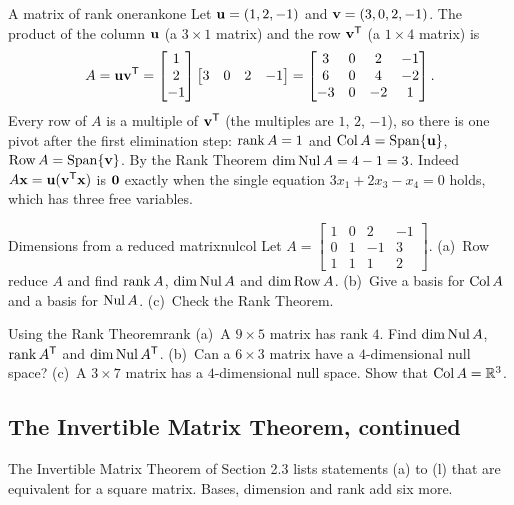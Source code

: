 \documentclass[11pt]{article}
\begin{document}
\begin{exmp}{A matrix of rank one}{rankone}
Let $\mathbf{u}=(1,2,-1)$ and $\mathbf{v}=(3,0,2,-1)$. The product of the column $\mathbf{u}$ (a $3\times1$ matrix) and the row $\mathbf{v}^{\mathsf T}$ (a $1\times4$ matrix) is
\[
A=\mathbf{u}\mathbf{v}^{\mathsf T}=\begin{bmatrix}1\\2\\-1\end{bmatrix}\begin{bmatrix}3&0&2&-1\end{bmatrix}=\begin{bmatrix}3&0&2&-1\\6&0&4&-2\\-3&0&-2&1\end{bmatrix}.
\]
Every row of $A$ is a multiple of $\mathbf{v}^{\mathsf T}$ (the multiples are $1$, $2$, $-1$), so there is one pivot after the first elimination step: $\operatorname{rank} A=1$ and $\operatorname{Col} A=\operatorname{Span}\{\mathbf{u}\}$, $\operatorname{Row} A=\operatorname{Span}\{\mathbf{v}\}$. By the Rank Theorem $\dim\operatorname{Nul} A=4-1=3$. Indeed $A\mathbf{x}=\mathbf{u}(\mathbf{v}^{\mathsf T}\mathbf{x})$ is $\mathbf{0}$ exactly when the single equation $3x_1+2x_3-x_4=0$ holds, which has three free variables.
\end{exmp}

\begin{kc}{Dimensions from a reduced matrix}{nulcol}
Let $A=\begin{bmatrix}1&0&2&-1\\0&1&-1&3\\1&1&1&2\end{bmatrix}$. (a)~Row reduce $A$ and find $\operatorname{rank} A$, $\dim\operatorname{Nul} A$ and $\dim\operatorname{Row} A$. (b)~Give a basis for $\operatorname{Col} A$ and a basis for $\operatorname{Nul} A$. (c)~Check the Rank Theorem.
\end{kc}

\begin{kc}{Using the Rank Theorem}{rank}
(a)~A $9\times5$ matrix has rank $4$. Find $\dim\operatorname{Nul} A$, $\operatorname{rank} A^{\mathsf T}$ and $\dim\operatorname{Nul} A^{\mathsf T}$. (b)~Can a $6\times3$ matrix have a $4$-dimensional null space? (c)~A $3\times7$ matrix has a $4$-dimensional null space. Show that $\operatorname{Col} A=\mathbb{R}^3$.
\end{kc}

\subsection*{The Invertible Matrix Theorem, continued}

The Invertible Matrix Theorem of Section 2.3 lists statements (a) to (l) that are equivalent for a square matrix. Bases, dimension and rank add six more.
\end{document}
